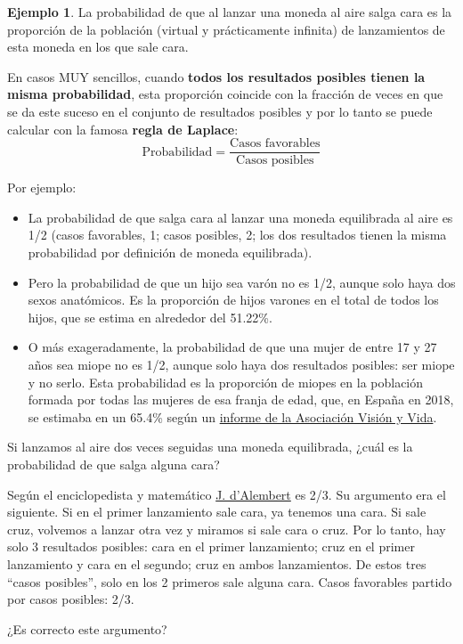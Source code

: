 \documentclass[
]{book}
\theoremstyle{definition}
\theoremstyle{definition}
\newtheorem{example}{Ejemplo}[chapter]
\theoremstyle{definition}
\theoremstyle{definition}
\theoremstyle{remark}
\begin{document}
\begin{example}
\protect\hypertarget{exm:unnamed-chunk-83}{}\label{exm:unnamed-chunk-83}La probabilidad de que al lanzar una moneda al aire salga cara es la proporción de la población (virtual y prácticamente infinita) de lanzamientos de esta moneda en los que sale cara.
\end{example}

En casos MUY sencillos, cuando \textbf{todos los resultados posibles tienen la misma probabilidad}, esta proporción coincide con la fracción de veces en que se da este suceso en el conjunto de resultados posibles y por lo tanto se puede calcular con la famosa \textbf{regla de Laplace}:
\[
\text{Probabilidad}=\frac{\text{Casos favorables}}{\text{Casos posibles}}
\]

Por ejemplo:

\begin{itemize}
\item
  La probabilidad de que salga cara al lanzar una moneda equilibrada al aire es 1/2 (casos favorables, 1; casos posibles, 2; los dos resultados tienen la misma probabilidad por definición de moneda equilibrada).
\item
  Pero la probabilidad de que un hijo sea varón no es 1/2, aunque solo haya dos sexos anatómicos. Es la proporción de hijos varones en el total de todos los hijos, que se estima en alrededor del 51.22\%.
\item
  O más exageradamente, la probabilidad de que una mujer de entre 17 y 27 años sea miope no es 1/2, aunque solo haya dos resultados posibles: ser miope y no serlo. Esta probabilidad es la proporción de miopes en la población formada por todas las mujeres de esa franja de edad, que, en España en 2018, se estimaba en un 65.4\% según un \href{http://visionyvida.org/informe-prevalencia-de-la-miopia-en-los-jovenes-en-espana-2018/}{informe de la Asociación Visión y Vida}.
\end{itemize}

\begin{rmdromans}
Si lanzamos al aire dos veces seguidas una moneda equilibrada, ¿cuál es la probabilidad de que salga alguna cara?

Según el enciclopedista y matemático \href{https://es.wikipedia.org/wiki/Jean_le_Rond_d\%27Alembert}{J. d'Alembert} es 2/3. Su argumento era el siguiente. Si en el primer lanzamiento sale cara, ya tenemos una cara. Si sale cruz, volvemos a lanzar otra vez y miramos si sale cara o cruz. Por lo tanto, hay solo 3 resultados posibles: cara en el primer lanzamiento; cruz en el primer lanzamiento y cara en el segundo; cruz en ambos lanzamientos. De estos tres ``casos posibles'', solo en los 2 primeros sale alguna cara. Casos favorables partido por casos posibles: 2/3.

¿Es correcto este argumento?
\end{rmdromans}
\end{document}
